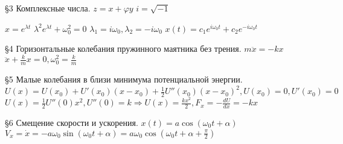 \documentclass[12pt]{article}
\begin{document}
    \S3 Комплексные числа. \newline
    $z = x + \varphi y$ \newline
    $i = \sqrt{-1}$ \newline

    $x = e^{\lambda t}$ \newline
    $\lambda^2 e^{\lambda t} + \omega_0^2 = 0$ \newline
    $\lambda_1 = i\omega_0, \lambda_2 = -i \omega_0$ \newline
    $x(t) = c_1e^{i\omega_0t} + c_2e^{-i\omega_0t}$ \newline

    \S4 Горизонтальные колебания пружинного маятника без трения. \newline
    $m\ddot x = -kx$ \newline
    $\ddot x + \frac{k}mx = 0, \omega_0^2 = \frac{k}m$ \newline

    \S5 Малые колебания в близи минимума потенциальной энергии. \newline
    $U(x) = U(x_0) + U'(x_0)(x-x_0) + \frac12U''(x_0)(x-x_0)^2, U(x_0) = 0, U'(x_0) = 0$ \newline
    $U(x) = \frac12 U''(0)x^2, U''(0) = k \Rightarrow U(x) = \frac{kx^2}2, F_x = -\frac{dU}{dx} = -kx$ \newline

    \S6 Смещение скорости и ускорения. \newline
    $x(t) = a \cos (\omega_0t + \alpha)$ \newline
    $V_x = \dot x = -a \omega_0 \sin(\omega_0t + \alpha) = a\omega_0\cos(\omega_0t + \alpha+ \frac{\pi}2)$ \newline
\end{document}
